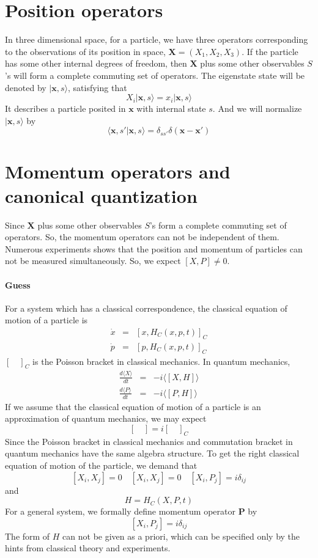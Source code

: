 \documentclass[cyan]{elegantnote}
\begin{document}
\section{Position operators}
\noindent
In three dimensional space, for a particle, we have three operators corresponding to the observations of its position in space, $\bm{X} = (X_1, X_2, X_3)$. If the particle has some other internal degrees of freedom, then $\bm{X}$ plus some other observables $S$'s will form  a complete commuting set of operators. The eigenstate state will be denoted by $| \bm{x},s \rangle$, satisfying that
\[X_i | \bm{x},s \rangle = x_i | \bm{x},s \rangle  \]
It describes a particle posited in $\bm{x}$ with internal state $s$. And we will normalize $| \bm{x},s \rangle $ by 
\[\langle \bm{x},s'| \bm{x},s \rangle = \delta_{ss'}\delta(\bm{x}-\bm{x}')\]

\section{Momentum operators and canonical quantization}
\noindent
Since $\bm{X}$ plus some other observables $S$'s form a complete commuting set of operators. So, the momentum operators can not be independent of them. Numerous experiments shows that the position and momentum of particles can not be measured simultaneously. So, we expect $[X,P] \neq 0$.
\paragraph{Guess} 
For a system which has a classical correspondence, the classical equation of motion of a particle is
\begin{eqnarray}
\dot{x} &=& [x,H_C(x,p,t)]_C \nonumber \\
\dot{p} &=& [p,H_C(x,p,t)]_C \nonumber
\end{eqnarray}
$[\quad]_C$ is the Poisson bracket in classical mechanics. In quantum mechanics,
\begin{eqnarray}
\frac{d\langle X \rangle}{dt} &=& -i \langle [X,H] \rangle \nonumber \\
\frac{d\langle P \rangle}{dt} &=& -i \langle [P,H] \rangle \nonumber
\end{eqnarray}
If we assume that the classical equation of motion of a particle is an approximation of quantum mechanics, we may expect
\[[\quad] = i [\quad]_C \]
Since the Poisson bracket in classical mechanics and commutation bracket in quantum mechanics have the same algebra structure. To get the right classical equation of motion of the particle, we demand that
\[[X_i,X_j] = 0 \quad [X_i,X_j] = 0 \quad [X_i,P_j] = i \delta_{ij}\]
and
\[H = H_C(X,P,t)\]
For a general system, we formally define momentum operator $\bm{P}$ by 
\[[X_i,P_j] = i \delta_{ij}\]
The form of $H$ can not be given as a priori, which can be specified only by the hints from classical theory and experiments.
\end{document}
